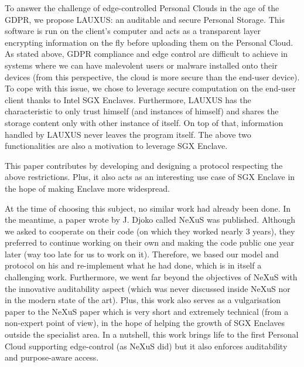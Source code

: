 \documentclass[../main.tex]{subfiles}
\begin{document}
\medbreak
\par To answer the challenge of edge-controlled Personal Clouds in the age of the GDPR, we propose LAUXUS: an auditable and secure Personal Storage. This software is run on the client's computer and acts as a transparent layer encrypting information on the fly before uploading them on the Personal Cloud. As stated above, GDPR compliance and edge control are difficult to achieve in systems where we can have malevolent users or malware installed onto their devices (from this perspective, the cloud is more secure than the end-user device). To cope with this issue, we chose to leverage secure computation on the end-user client thanks to Intel SGX Enclaves. Furthermore, LAUXUS has the characteristic to only trust himself (and instances of himself) and shares the storage content only with other instance of itself. On top of that, information handled by LAUXUS never leaves the program itself. The above two functionalities are also a motivation to leverage SGX Enclave.
\par This paper contributes by developing and designing a protocol respecting the above restrictions. Plus, it also acts as an interesting use case of SGX Enclave in the hope of making Enclave more widespread.
\par At the time of choosing this subject, no similar work had already been done. In the meantime, a paper wrote by J. Djoko called NeXuS\cite{djoko2019nexus} was published. Although we asked to cooperate on their code (on which they worked nearly 3 years), they preferred to continue working on their own and making the code public one year later (way too late for us to work on it). Therefore, we based our model and protocol on his and re-implement what he had done, which is in itself a challenging work.  Furthermore, we went far beyond the objectives of NeXuS with the innovative auditability aspect (which was never discussed inside NeXuS nor in the modern state of the art). Plus, this work also serves as a vulgarisation paper to the NeXuS paper which is very short and extremely technical (from a non-expert point of view), in the hope of helping the growth of SGX Enclaves outside the specialist area. In a nutshell, this work brings life to the first Personal Cloud supporting edge-control (as NeXuS did) but it also enforces auditability and purpose-aware access.
\end{document}
